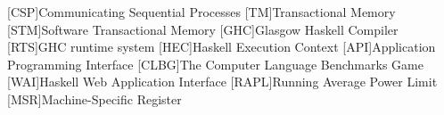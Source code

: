 \begin{acronym}[ACRONYM]
[CSP]{Communicating Sequential Processes}
[TM]{Transactional Memory}
[STM]{Software Transactional Memory}
[GHC]{Glasgow Haskell Compiler}
[RTS]{GHC runtime system}
[HEC]{Haskell Execution Context}
[API]{Application Programming Interface}
[CLBG]{The Computer Language Benchmarks Game}
[WAI]{Haskell Web Application Interface}
[RAPL]{Running Average Power Limit}
[MSR]{Machine-Specific Register}
\end{acronym}
